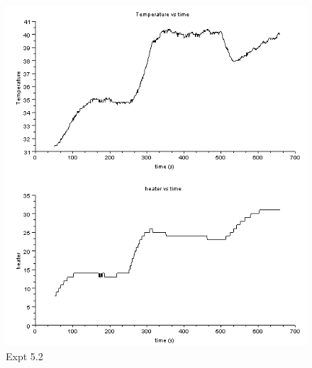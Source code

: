 \begin{figure}[H]
  \includegraphics[]{mpc/5_2_heater_final.png}
  \caption{Expt 5.2}
\end{figure}

